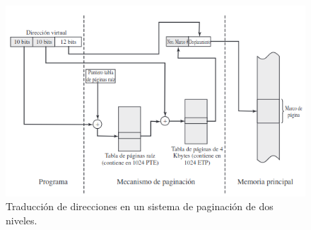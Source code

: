 \documentclass[12pt,a4paper]{article}
\begin{document}
\begin{figure}[H]
    \centering
    \includegraphics[width=15cm]{virtual3.png}
    \caption{Traducción de direcciones en un sistema de paginación de dos niveles.}
\end{figure}
\end{document}
